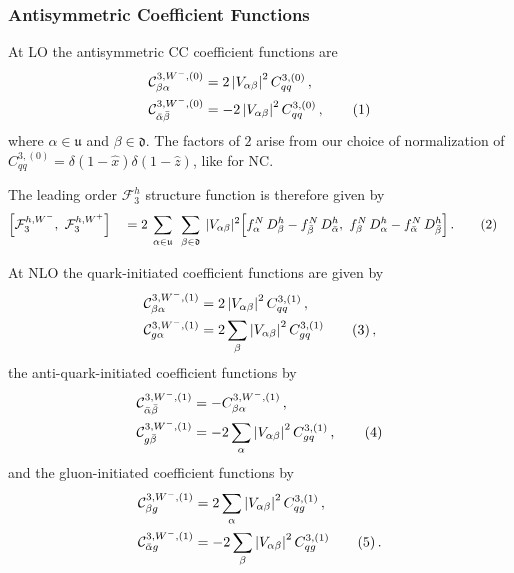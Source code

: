 \documentclass[11pt,a4paper]{article}
\newcommand{\Fcal}{\mathcal{F}}
\newcommand{\Ccal}{\mathcal{C}}
\newcommand{\xh}{\hat{x}}
\newcommand{\zh}{\hat{z}}
\newcommand\numberthis{\addtocounter{equation}{1}\tag{\theequation}}
\begin{document}
\subsubsection{Antisymmetric Coefficient Functions}
At LO the antisymmetric CC coefficient functions are
\begin{align*}
\Ccal^{3,W^{-},(0)}_{\beta\alpha} &= 2 \left|V_{\alpha\beta}\right|^2 C^{3,(0)}_{qq} \,  ,  \\
\Ccal^{3,W^{-},(0)}_{\bar{\alpha}\bar{\beta}} &=- 2 \left|V_{\alpha\beta}\right|^2 C^{3,(0)}_{qq} \,  , \numberthis
\end{align*}
where $\alpha\in \mathfrak{u}$ and  $\beta\in \mathfrak{d}$.
The factors of $2$ arise from our choice of normalization of $C^{3,(0)}_{qq} = \delta(1-\xh) \delta(1-\zh)$, like for NC.

The leading order $\Fcal_3^h$ structure function is therefore given by
\begin{alignat*}{3}
& \Big[ \Fcal_{3}^{h,W^-},~ \Fcal_{3}^{h,W^+} \Big] &&= 2 \sum_{\phantom| \alpha\in \mathfrak{u} \phantom|} \sum_{\phantom| \beta\in \mathfrak{d} \phantom| } |V_{\alpha\beta}|^2 \Big[ f_\alpha^N \, D_\beta^h - f_{\bar{\beta}}^N \, D_{\bar{\alpha}}^h ,~ f_\beta^N \, D_\alpha^h - f_{\bar{\alpha}}^N \, D_{\bar{\beta}}^h \Big] \, . \numberthis
\end{alignat*}

At NLO the quark-initiated coefficient functions are given by
\begin{align*}
\Ccal^{3,W^{-},(1)}_{\beta\alpha} &= 2 \left|V_{\alpha\beta}\right|^2 C^{3,(1)}_{qq} \,  , \\
\Ccal^{3,W^{-},(1)}_{g\alpha} &= 2 \sum_\beta \left|V_{\alpha\beta}\right|^2 C^{3,(1)}_{gq}  \numberthis \,  ,
\end{align*}
the anti-quark-initiated coefficient functions by
\begin{align*}
\Ccal^{3,W^{-},(1)}_{\bar{\alpha}\bar{\beta}} &= -C^{3,W^{-},(1)}_{\beta\alpha}  \,  , \\
\Ccal^{3,W^{-},(1)}_{g\bar{\beta}} & = -2\sum_\alpha \left|V_{\alpha\beta}\right|^2 C^{3,(1)}_{gq} \, , \numberthis
\end{align*}
and the gluon-initiated coefficient functions by
\begin{align*}
\Ccal^{3,W^{-},(1)}_{\beta g} &= 2 \sum_\alpha \left|V_{\alpha\beta}\right|^2 C^{3,(1)}_{qg} \,  , \\
\Ccal^{3,W^{-},(1)}_{\bar{\alpha}g}  & =  - 2 \sum_\beta \left|V_{\alpha\beta}\right|^2 C^{3,(1)}_{qg} \numberthis \, .
\end{align*}
\end{document}
